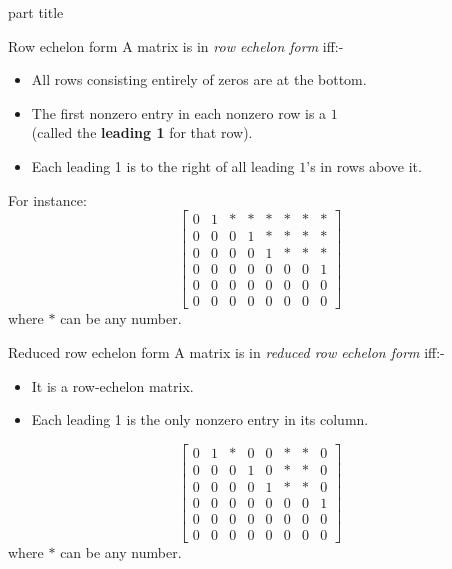 \documentclass{beamer}
\begin{document}
\begin{frame}
    \begin{beamercolorbox}[sep=12pt,center]{part title}
      \insertsection\par
    \end{beamercolorbox}
\end{frame}
\begin{frame}{Row echelon form}
  A matrix is in \emph{row echelon form} iff:-
  \begin{itemize}
  \item All rows consisting entirely of zeros are at the 
    bottom.
  \item The first nonzero entry in each nonzero row is a $1$
    \\(called the {\bf leading 1} for that row).
  \item Each leading 1 is to the right of all leading $1$'s 
    in rows above it.
  \end{itemize}
  For instance:
  \begin{equation*}
    \left[\begin{array}{rrrrrrrr}
            0 & 1 & * & * & * & * & * & * \\
            0 & 0 & 0 & 1 & * & * & * & * \\
            0 & 0 & 0 & 0 & 1 & * & * & * \\
            0 & 0 & 0 & 0 & 0 & 0 & 0 & 1 \\
            0 & 0 & 0 & 0 & 0 & 0 & 0 & 0 \\
            0 & 0 & 0 & 0 & 0 & 0 & 0 & 0 
          \end{array}\right]
      \end{equation*}
      where $*$ can be any number.
\end{frame}

\begin{frame}{Reduced row echelon form}
  A matrix is in \emph{reduced row echelon form} iff:-
  \begin{itemize}
  \item It is a row-echelon matrix.
  \item Each leading 1 is the only nonzero entry in its
    column.
  \end{itemize}
  \begin{equation*}
      \left[\begin{array}{rrrrrrrr}
              0 & 1 & * & 0 & 0 & * & * & 0 \\
              0 & 0 & 0 & 1 & 0 & * & * & 0 \\
              0 & 0 & 0 & 0 & 1 & * & * & 0 \\
              0 & 0 & 0 & 0 & 0 & 0 & 0 & 1 \\
              0 & 0 & 0 & 0 & 0 & 0 & 0 & 0 \\
              0 & 0 & 0 & 0 & 0 & 0 & 0 & 0 
            \end{array}\right] 
        \end{equation*}
        where $*$ can be any number.
\end{frame}
\end{document}
